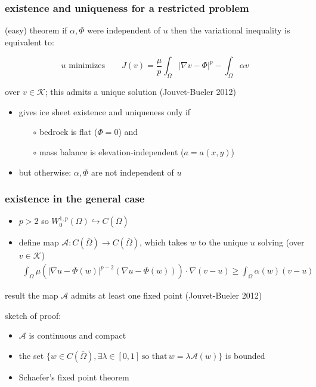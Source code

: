 \documentclass[hide notes,intlimits]{beamer}
\begin{document}
\begin{frame}
  \frametitle{existence and uniqueness for a restricted problem} 

\begin{block}{(easy) theorem}
if $\alpha,\Phi$ were independent of $u$ then the variational inequality is equivalent to:

\begin{equation*}
u \text{ minimizes} \qquad J(v) = \frac{\mu}{p} \int_{\Omega} |\nabla v - \Phi |^p - \int_{\Omega}  \alpha v
\end{equation*}

over $v\in\mathcal{K}$; this admits a unique solution \hfill \scriptsize (Jouvet-Bueler 2012)
\end{block}

\bigskip
\begin{itemize}
\item gives ice sheet existence and uniqueness only if
  \begin{itemize}
  \item[$\circ$]  bedrock is flat ($\Phi = 0$) and
  \item[$\circ$]  mass balance is elevation-independent ($a=a(x,y)$)
  \end{itemize}
\item but otherwise: $\alpha,\Phi$ are not independent of $u$
\end{itemize}
\end{frame}
 

\begin{frame} 
  \frametitle{ existence in the general case } 

\begin{itemize}
\item $p>2$ so $W^{1,p}_0 (\Omega) \hookrightarrow C(\overline{\Omega})$
\item define map $\mathcal{A}:C(\overline{\Omega}) \rightarrow C(\overline{\Omega})$,
which takes $w$ to the unique $u$ solving (over $v\in \mathcal{K}$)
\begin{align*}
\int_{\Omega}   \mu  \left( | \nabla u - \Phi(w) |^{p-2} 
( \nabla u - \Phi(w) )    \right)  \cdot \nabla ( v - u )  
\ge \int_{\Omega} \alpha(w) (  v -  u )
\end{align*}
\end{itemize}

\begin{block}{result}
the map $\mathcal{A}$ admits at least one fixed point \hfill \scriptsize (Jouvet-Bueler 2012)
\end{block}

\vfill
\scriptsize
sketch of proof:
\begin{itemize}
\item $\mathcal{A}$ is continuous and compact
\item the set $\{ w \in C(\overline{\Omega}), \exists \lambda \in [0,1]\, \text{so that} \,w = \lambda \mathcal{A}(w)\}$ is bounded 
\item Schaefer's fixed point theorem
\end{itemize}
\end{frame}
\end{document}

